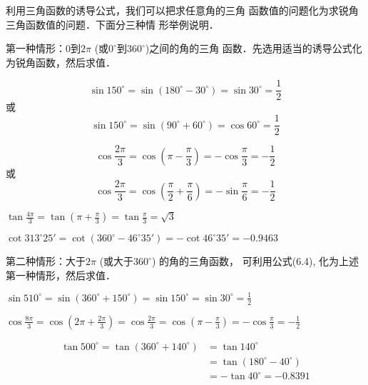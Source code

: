 利用三角函数的诱导公式，我们可以把求任意角的三角
函数值的问题化为求锐角三角函数值的问题．下面分三种情
形举例说明．

第一种情形：0到$2\pi$ (或$0^{\circ}$到$360^{\circ}$)之间的角的三角
函数．先选用适当的诱导公式化为锐角函数，然后求值．

\begin{example}
\[\sin 150^{\circ}=\sin(180^{\circ}-30^{\circ})=\sin30^{\circ}=\frac{1}{2}\]
或
  \[\sin 150^{\circ}=\sin(90^{\circ}+60^{\circ})=\cos60^{\circ}=\frac{1}{2}\]  
\end{example}

\begin{example}
\[\cos\frac{2\pi}{3}=\cos\left(\pi-\frac{\pi}{3}\right)=-\cos\frac{\pi}{3}=-\frac{1}{2}\]
或
\[\cos\frac{2\pi}{3}=\cos\left(\frac{\pi}{2}+\frac{\pi}{6}\right)=-\sin\frac{\pi}{6}=-\frac{1}{2}\]
\end{example}

\begin{example}
    $\tan\frac{4\pi}{3}=\tan\left(\pi+\frac{\pi}{3}\right)=\tan\frac{\pi}{3}=\sqrt{3}$
\end{example}

\begin{example}
$\cot313^{\circ}25'=\cot(360^{\circ}-46^{\circ}35')=-\cot46^{\circ}35'=-0.9463$
\end{example}

第二种情形：大于$2\pi$ (或大于$360^{\circ}$) 的角的三角函数，
可利用公式(6.4), 化为上述第一种情形，然后求值．

\begin{example}
    $\sin 510^{\circ}=\sin(360^{\circ}+150^{\circ})=\sin150^{\circ}=\sin30^{\circ}=\frac{1}{2}$
\end{example}


\begin{example}
    $\cos\frac{8\pi}{3}=\cos\left(2\pi+\frac{2\pi}{3}\right)=\cos\frac{2\pi}{3}=\cos\left(\pi-\frac{\pi}{3}\right)=-\cos\frac{\pi}{3}=-\frac{1}{2}$
\end{example}

\begin{example}
\[\begin{split}
    \tan500^{\circ}=\tan(360^{\circ}+140^{\circ})&=\tan 140^{\circ}\\
    &=\tan(180^{\circ}-40^{\circ})\\ &=-\tan40^{\circ}=-0.8391
\end{split}\]
\end{example}

